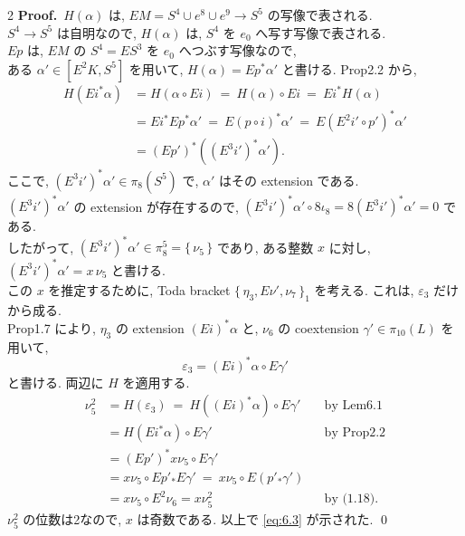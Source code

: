 \documentclass[10pt, leqno]{ltjsarticle}
\newcommand{\todai}[2][]{\{\,#2\,\}_{#1}}      %
\newcommand{\gen}[1]{\{\,#1\,\}}       %
\newcommand{\pis}[2]{\pi_{#1}(#2)}       %
\numberwithin{equation}{section}
\theoremstyle{plain}
\theoremstyle{definition}
\theoremstyle{remark}
\begin{document}
\begin{paracol}{2}
\noindent
\textbf{Proof.}\
\(H(\alpha)\) は,
\(EM = S^4\cup e^8 \cup e^9 \to S^{5}\) の写像で表される. \\
\(S^{4}\to S^{5}\) は自明なので, 
\(H(\alpha)\) は, 
\(S^4\) を \(e_0\) へ写す写像で表される. \\
\(Ep\) は, \(EM\) の \(S^4 = ES^3\) を 
\(e_0\) へつぶす写像なので, \\
ある \(\alpha'\in[E^{2}K, S^{5}]\) を用いて,
\(H(\alpha)=E p^{\ast}\alpha'\) と書ける. 
Prop2.2 から,
\[
\begin{align*}
  H(Ei^{\ast}\alpha)
  & = H(\alpha\circ Ei) \ = \ H(\alpha)\circ Ei \ = \ Ei^* H(\alpha)\\
  & = Ei^{\ast}Ep^*\alpha' \ = \ E(p\circ i)^*\alpha' 
  \ = \ E(E^2 i'\circ p')^*\alpha' \\
  & = (Ep')^{\ast}((E^3 i')^{\ast}\alpha') .
\end{align*}
\]
ここで, \((E^3 i')^{\ast}\alpha'\in\pi_{8}(S^{5})\) で, 
\(\alpha'\) はその extension である. \\
\((E^3 i')^{\ast}\alpha'\) の extension が存在するので,
\((E^3 i')^*\alpha'\circ8\iota_8 = 8(E^3 i')^{\ast}\alpha' = 0\) である. \\
したがって, 
\((E^3 i')^{\ast}\alpha'\in \pi^{5}_{8}=\gen{\nu_{5}}\) であり, 
ある整数 \(x\) に対し,
\((E^3 i')^{\ast}\alpha'=x\,\nu_{5}\) と書ける. \\
この \(x\) を推定するために, Toda bracket
\(\todai[1]{\eta_{3},E\nu',\nu_{7}}\) を考える. 
これは, \(\varepsilon_3\) だけから成る. \\
Prop1.7 により, 
\(\eta_{3}\) の extension \((Ei)^{\ast}\alpha\) と,
\(\nu_{6}\) の coextension \(\gamma'\in\pis{10}{L}\) 
を用いて,
\[
\varepsilon_{3}=(Ei)^{\ast}\alpha\circ E\gamma'
\]
と書ける. 両辺に \(H\) を適用する. 
\[
\begin{align*}
\nu_{5}^{2}
& = H(\varepsilon_{3}) \ =\ H((Ei)^{\ast}\alpha)\circ E\gamma' 
&& \text{by Lem6.1}\\
& = H(Ei^*\alpha)\circ E\gamma' 
&& \text{by Prop2.2}\\
& = (Ep')^{\ast} x \nu_5\circ E\gamma'\\
& = x \nu_5\circ Ep'_* E\gamma' \ = \ x \nu_5\circ E(p'_* \gamma')\\
& = x \nu_5\circ E^2 \nu_6 = x\nu_5^2 
&& \text{by (1.18)} .  
\end{align*}
\]
\(\nu_{5}^{2}\) の位数は2なので, \(x\) は奇数である. 
以上で \eqref{eq:6.3} が示された. 
\qed



\end{paracol}
\end{document}
